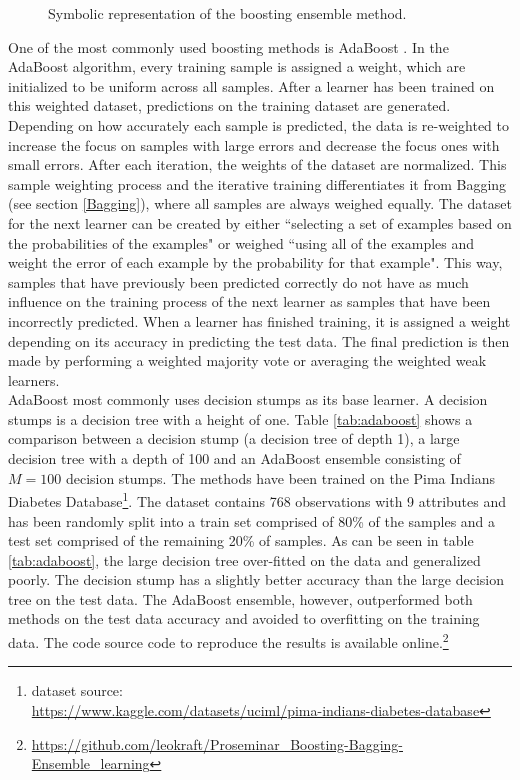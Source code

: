 \begin{figure}[htbp]
    \centering
    
    \caption{Symbolic representation of the boosting ensemble method.\footnotemark }
    \label{fig:boosting}
\end{figure}

\noindent One of the most commonly used boosting methods is AdaBoost \citep{Freund.1997}. In the AdaBoost algorithm, every training sample is assigned a weight, which are initialized to be uniform across all samples. After a learner has been trained on this weighted dataset, predictions on the training dataset are generated. Depending on how accurately each sample is predicted, the data is re-weighted to increase the focus on samples with large errors and decrease the focus ones with small errors. After each iteration, the weights of the dataset are normalized. This sample weighting process and the iterative training differentiates it from Bagging (see section \ref{Bagging}), where all samples are always weighed equally. The dataset for the next learner can be created by either ``selecting a set of examples based on the probabilities of the examples" or weighed ``using all of the examples and weight the error of each example by the probability for that example". \citep{Opitz.1999} This way, samples that have previously been predicted correctly do not have as much influence on the training process of the next learner as samples that have been incorrectly predicted. When a learner has finished training, it is assigned a weight depending on its accuracy in predicting the test data. The final prediction is then made by performing a weighted majority vote or averaging the weighted weak learners.\\

AdaBoost most commonly uses decision stumps as its base learner. A decision stumps is a decision tree with a height of one. Table \ref{tab:adaboost} shows a comparison between a decision stump (a decision tree of depth 1), a large decision tree with a depth of 100 and an AdaBoost ensemble consisting of $M=100$ decision stumps. The methods have been trained on the Pima Indians Diabetes Database\footnote{dataset source:\\\hphantom{~}\hspace{1.465em}\url{https://www.kaggle.com/datasets/uciml/pima-indians-diabetes-database}}. The dataset contains 768 observations with 9 attributes and has been randomly split into a train set comprised of 80\% of the samples and a test set comprised of the remaining 20\% of samples. As can be seen in table \ref{tab:adaboost}, the large decision tree over-fitted on the data and generalized poorly. The decision stump has a slightly better accuracy than the large decision tree on the test data. The AdaBoost ensemble, however, outperformed both methods on the test data accuracy and avoided to overfitting on the training data. The code source code to reproduce the results is available online.\footnote{\url{https://github.com/leokraft/Proseminar_Boosting-Bagging-Ensemble_learning}}

